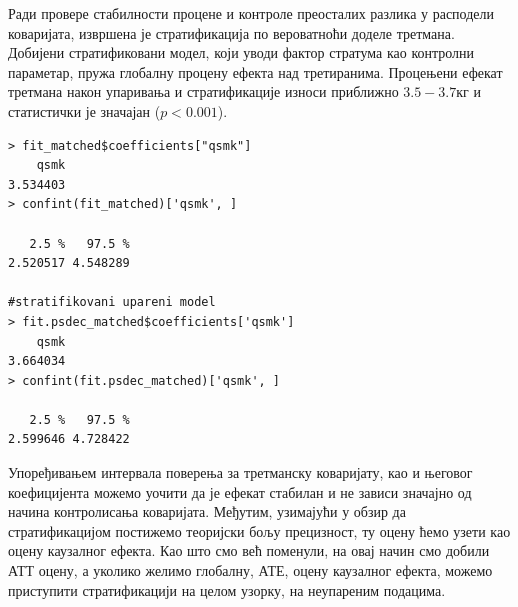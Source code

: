 \documentclass[12pt, a4paper]{article}
\begin{document}

Ради провере стабилности процене и контроле преосталих разлика у расподели коваријата, извршена је стратификација по вероватноћи доделе третмана. Добијени стратификовани модел, који уводи фактор стратума као контролни параметар, пружа глобалну процену ефекта над третиранима. Процењени ефекат третмана након упаривања и стратификације износи приближно $3.5 - 3.7$кг и статистички је значајан ($p < 0.001$).



\begin{verbatim}
> fit_matched$coefficients["qsmk"]
    qsmk 
3.534403 
> confint(fit_matched)['qsmk', ]

   2.5 %   97.5 % 
2.520517 4.548289 

#stratifikovani upareni model
> fit.psdec_matched$coefficients['qsmk']
    qsmk 
3.664034 
> confint(fit.psdec_matched)['qsmk', ]

   2.5 %   97.5 % 
2.599646 4.728422 
\end{verbatim}

Упоређивањем интервала поверења за третманску коваријату, као и његовог коефицијента можемо уочити да је ефекат стабилан и не зависи значајно од начина контролисања коваријата. Међутим, узимајући у обзир да стратификацијом постижемо теоријски бољу прецизност, ту оцену ћемо узети као оцену каузалног ефекта. Као што смо већ поменули, на овај начин смо добили АТТ оцену, а уколико желимо глобалну, АТЕ, оцену каузалног ефекта, можемо приступити стратификацији на целом узорку, на неупареним подацима. 
\end{document}
